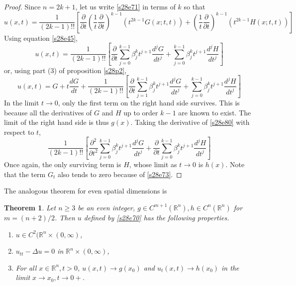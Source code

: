 \documentclass{article}
\newcommand{\td}[2]{\frac{d{#1}}{d{#2}}}
\theoremstyle{plain}
\newtheorem{thm}{Theorem}
\numberwithin{thm}{section}
\theoremstyle{plain}
\numberwithin{prop}{section}
\theoremstyle{definition}
\numberwithin{defn}{section}
\theoremstyle{remark}
\numberwithin{equation}{section}
\begin{document}
\begin{proof}
Since $n=2k+1$, let us write \eqref{s28e71} in terms of $k$ so that
\[
u(x,t) = \frac{1}{(2k-1)!!}\left[\frac{\partial}{\partial t}
\left(\frac{1}{t}\frac{\partial}{\partial t}\right)^{k-1}(t^{2k-1}G(x; t,t)) +
\left(\frac{1}{t}\frac{\partial}{\partial t}\right)^{k-1}(t^{2k-1}H(x; t,t))\right]
\]
Using equation \eqref{s28e45}, 
\begin{equation}\label{s28e80}
u(x,t) = \frac{1}{(2k-1)!!}\left[\frac{\partial}{\partial t}\sum_{j=0}^{k-1}\beta_j^kt^{j+1}\frac{d^jG}{dt^j}
+ \sum_{j=0}^{k-1}\beta_j^kt^{j+1}\frac{d^jH}{dt^j}\right]
\end{equation}
or, using part (3) of proposition \ref{s28p2},
\[
u(x,t) = G + t\td{G}{t} + \frac{1}{(2k-1)!!}\left[
\frac{\partial}{\partial t}\sum_{j=1}^{k-1}\beta_j^kt^{j+1}\frac{d^jG}{dt^j}
+ \sum_{j=0}^{k-1}\beta_j^kt^{j+1}\frac{d^jH}{dt^j}\right]
\]
In the limit $t \rightarrow 0$, only the first term on the right hand side survives. This is because all the 
derivatives of $G$ and $H$ up to order $k-1$ are known to exist. The limit of the right hand side is thus $g(x)$. 
Taking the derivative of \eqref{s28e80} with respect to $t$,
\[
\frac{1}{(2k-1)!!}\left[\frac{\partial^2}{\partial t^2}\sum_{j=0}^{k-1}\beta_j^kt^{j+1}\frac{d^jG}{dt^j}
+ \frac{\partial}{\partial t}\sum_{j=0}^{k-1}\beta_j^kt^{j+1}\frac{d^jH}{dt^j}\right]
\]
Once again, the only surviving term is $H$, whose limit as $t \rightarrow 0$ is $h(x)$. Note that the term $G_t$
also tends to zero because of \eqref{s28e73}.
\end{proof}

The analogous theorem for even spatial dimensions is
\begin{thm}\label{s28t2}
Let $n \ge 3$ be an even integer, $g \in C^{m+1}(\mathbb{R}^n), h \in C^n(\mathbb{R}^n)$ for $m = (n + 2)/2$. Then
$u$ defined by \eqref{s28e70} has the following properties.
\begin{enumerate}
\item $u \in C^2(\mathbb{R}^n \times (0, \infty)$,
\item $u_{tt} - \Delta u = 0$ in $\mathbb{R}^n \times (0, \infty)$,
\item For all $x \in \mathbb{R}^n, t > 0$, $u(x, t) \rightarrow g(x_0)$ and $u_t(x, t) \rightarrow h(x_0)$ in the
limit $x \rightarrow x_0, t \rightarrow 0+$.
\end{enumerate}
\end{thm}
\end{document}
